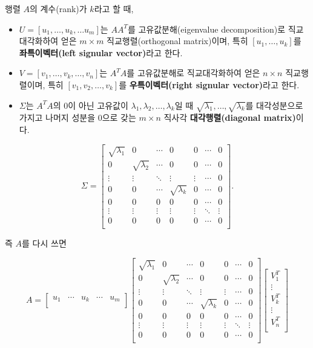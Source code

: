 \documentclass[b5paper,]{book}
\theoremstyle{definition}
\theoremstyle{definition}
\theoremstyle{definition}
\theoremstyle{remark}
\begin{document}
행렬 \(A\)의 계수(rank)가 \(k\)라고 할 때,

\begin{itemize}
\item
  \(U=[u_{1},\ldots , u_{k}, \ldots u_{m}]\)는 \(AA^{T}\)를
  고유값분해(eigenvalue decomposition)로 직교대각화하여 얻은
  \(m\times m\) 직교행렬(orthogonal matrix)이며, 특히
  \([u_{1},\ldots, u_{k}]\)를 \textbf{좌특이벡터(left signular
  vector)}라고 한다.
\item
  \(V=[v_{1},\ldots ,v_{k},\ldots , v_{n}]\)는 \(A^{T}A\)를 고유값분해로
  직교대각화하여 얻은 \(n\times n\) 직교행렬이며, 특히
  \([v_{1},v_{2},\ldots ,v_{k}]\)를 \textbf{우특이벡터(right signular
  vector)}라고 한다.
\item
  \(\Sigma\)는 \(A^{T}A\)의 0이 아닌 고유값이
  \(\lambda_{1},\lambda_{2},\ldots , \lambda_{k}\)일 때
  \(\sqrt{\lambda_{1}},\ldots, \sqrt{\lambda_{k}}\)를 대각성분으로
  가지고 나머지 성분을 0으로 갖는 \(m\times n\) 직사각
  \textbf{대각행렬(diagonal matrix)}이다.
\end{itemize}

\[
\Sigma=
\begin{bmatrix}
\sqrt{\lambda_{1}} & 0 & \cdots & 0 & 0 & \cdots & 0\\
0 & \sqrt{\lambda_{2}} & \cdots & 0 & 0 & \cdots & 0\\
\vdots & \vdots & \ddots & \vdots & \vdots & \cdots & 0\\
0 & 0 & \cdots & \sqrt{\lambda_{k}} & 0 & \cdots & 0\\
0 & 0 & 0 & 0 & 0 & \cdots & 0\\
\vdots & \vdots & \vdots & \vdots & \vdots & \ddots & \vdots\\
0 & 0 & 0 & 0 & 0 & \cdots & 0\\
\end{bmatrix}.
\]

즉 \(A\)를 다시 쓰면

\[
A=
\begin{bmatrix}
u_{1} & \cdots & u_{k} & \cdots & u_{m}\\
\end{bmatrix}
\begin{bmatrix}
\sqrt{\lambda_{1}} & 0 & \cdots & 0 & 0 & \cdots & 0\\
0 & \sqrt{\lambda_{2}} & \cdots & 0 & 0 & \cdots & 0\\
\vdots & \vdots & \ddots & \vdots & \vdots & \cdots & 0\\
0 & 0 & \cdots & \sqrt{\lambda_{k}} & 0 & \cdots & 0\\
0 & 0 & 0 & 0 & 0 & \cdots & 0\\
\vdots & \vdots & \vdots & \vdots & \vdots & \ddots & \vdots\\
0 & 0 & 0 & 0 & 0 & \cdots & 0\\
\end{bmatrix}
\begin{bmatrix}
V_{1}^{T}\\
\vdots \\
V_{k}^{T}\\
\vdots\\
V_{n}^{T}\\
\end{bmatrix}
\]
\end{document}
